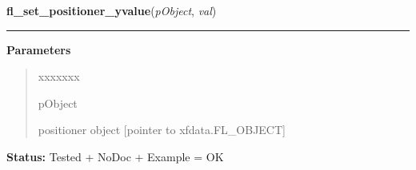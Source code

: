 \hspace{.8\funcindent}\begin{boxedminipage}{\funcwidth}

    \raggedright \textbf{fl\_set\_positioner\_yvalue}(\textit{pObject}, \textit{val})

    \vspace{-1.5ex}

    \rule{\textwidth}{0.5\fboxrule}
\setlength{\parskip}{2ex}
\setlength{\parskip}{1ex}
      \textbf{Parameters}
      \vspace{-1ex}

      \begin{quote}
        \begin{Ventry}{xxxxxxx}

          \item[pObject]

          positioner object [pointer to xfdata.FL\_OBJECT]

        \end{Ventry}

      \end{quote}

\textbf{Status:} Tested + NoDoc + Example = OK



    \end{boxedminipage}

    \label{xformslib:library:fl_get_positioner_yvalue}

    \vspace{0.5ex}

